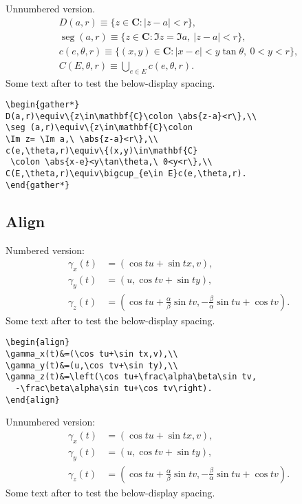\documentclass{article}
\theoremstyle{definition}
\theoremstyle{remark}
\DeclareMathOperator{\seg}{seg}
\newcommand{\envert}[1]{\left\lvert#1\right\rvert}
\let\abs=\envert
\begin{document}
Unnumbered version.
\begin{gather*}
D(a,r)\equiv\{z\in\mathbf{C}\colon \abs{z-a}<r\},\\
\seg (a,r)\equiv\{z\in\mathbf{C}\colon
\Im z= \Im a,\ \abs{z-a}<r\},\\
c(e,\theta,r)\equiv\{(x,y)\in\mathbf{C}
 \colon \abs{x-e}<y\tan\theta,\ 0<y<r\},\\
C(E,\theta,r)\equiv\bigcup_{e\in E}c(e,\theta,r).
\end{gather*}
Some text after to test the below-display spacing.
\begin{verbatim}
\begin{gather*}
D(a,r)\equiv\{z\in\mathbf{C}\colon \abs{z-a}<r\},\\
\seg (a,r)\equiv\{z\in\mathbf{C}\colon
\Im z= \Im a,\ \abs{z-a}<r\},\\
c(e,\theta,r)\equiv\{(x,y)\in\mathbf{C}
 \colon \abs{x-e}<y\tan\theta,\ 0<y<r\},\\
C(E,\theta,r)\equiv\bigcup_{e\in E}c(e,\theta,r).
\end{gather*}
\end{verbatim}

\newpage
\subsection{Align}
Numbered version:
\begin{align}
\gamma_x(t)&=(\cos tu+\sin tx,v),\\
\gamma_y(t)&=(u,\cos tv+\sin ty),\\
\gamma_z(t)&=\left(\cos tu+\frac\alpha\beta\sin tv,
  -\frac\beta\alpha\sin tu+\cos tv\right).
\end{align}
Some text after to test the below-display spacing.

\begin{verbatim}
\begin{align}
\gamma_x(t)&=(\cos tu+\sin tx,v),\\
\gamma_y(t)&=(u,\cos tv+\sin ty),\\
\gamma_z(t)&=\left(\cos tu+\frac\alpha\beta\sin tv,
  -\frac\beta\alpha\sin tu+\cos tv\right).
\end{align}
\end{verbatim}

Unnumbered version:
\begin{align*}
\gamma_x(t)&=(\cos tu+\sin tx,v),\\
\gamma_y(t)&=(u,\cos tv+\sin ty),\\
\gamma_z(t)&=\left(\cos tu+\frac\alpha\beta\sin tv,
  -\frac\beta\alpha\sin tu+\cos tv\right).
\end{align*}
Some text after to test the below-display spacing.
\end{document}
